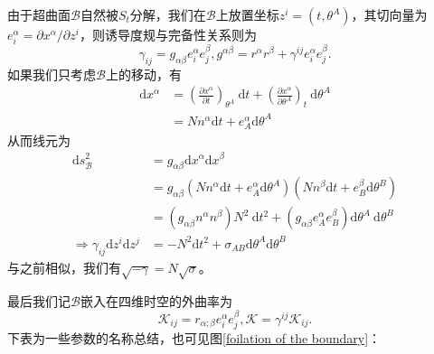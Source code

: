 \documentclass[hyperref, UTF8, a4paper]{ctexart}
\begin{document}
由于超曲面$\mathscr{B}$自然被$S_{t}$分解，我们在$\mathscr{B}$上放置坐标$z^{i} =(t,\theta ^{A} )$，其切向量为$e_{i}^{\alpha } =\partial x^{\alpha } /\partial z^{i}$，则诱导度规与完备性关系则为
\begin{equation*}
	\gamma _{ij} =g_{\alpha \beta } e_{i}^{\alpha } e_{j}^{\beta } ,g^{\alpha \beta } =r^{\alpha } r^{\beta } +\gamma ^{ij} e_{i}^{\alpha } e_{j}^{\beta } .
\end{equation*}
如果我们只考虑$\mathscr{B}$上的移动，有
\begin{equation*}
	\begin{aligned}
		\mathrm{d} x^{\alpha } & =\left(\frac{\partial x^{\alpha }}{\partial t}\right)_{\theta ^{A}} \ \mathrm{d} t+\left(\frac{\partial x^{\alpha }}{\partial \theta ^{A}}\right)_{t}\mathrm{\ d} \theta ^{A}\\
		& =Nn^{\alpha }\mathrm{d} t+e_{A}^{\alpha }\mathrm{d} \theta ^{A}
	\end{aligned}
\end{equation*}
从而线元为
\begin{equation*}
	\begin{aligned}
		\mathrm{d} s_{\mathscr{B}}^{2} & =g_{\alpha \beta }\mathrm{d} x^{\alpha }\mathrm{d} x^{\beta }\\
		& =g_{\alpha \beta }\left( Nn^{\alpha }\mathrm{d} t+e_{A}^{\alpha }\mathrm{d} \theta ^{A}\right)\left( Nn^{\beta }\mathrm{d} t+e_{B}^{\beta }\mathrm{d} \theta ^{B}\right)\\
		& =\left( g_{\alpha \beta } n^{\alpha } n^{\beta }\right) N^{2} \ \mathrm{d} t^{2} +\left( g_{\alpha \beta } e_{A}^{\alpha } e_{B}^{\beta }\right)\mathrm{d} \theta ^{A} \ \mathrm{d} \theta ^{B}\\
		\Rightarrow \gamma _{ij}\mathrm{d} z^{i}\mathrm{d} z^{j} & =-N^{2}\mathrm{d} t^{2} +\sigma _{AB}\mathrm{d} \theta ^{A}\mathrm{d} \theta ^{B}
	\end{aligned}
\end{equation*}
与之前相似，我们有$\sqrt{-\gamma } =N\sqrt{\sigma }$。

最后我们记$\mathscr{B}$嵌入在四维时空的外曲率为
\begin{equation*}
	\mathscr{K}_{ij} =r_{\alpha ;\beta } e_{i}^{\alpha } e_{j}^{\beta } ,\mathscr{K} =\gamma ^{ij}\mathscr{K}_{ij} .
\end{equation*}
下表为一些参数的名称总结，也可见图\ref{foilation of the boundary}：
\end{document}

